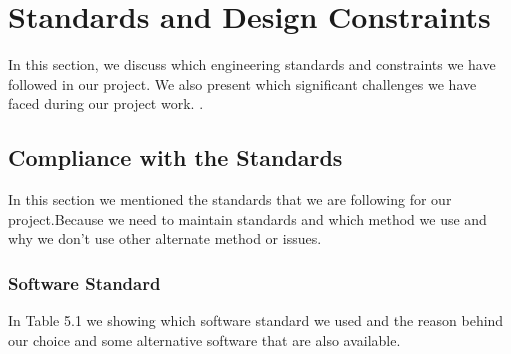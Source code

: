 \chapter{Standards and Design Constraints}
In this section, we discuss which engineering standards and constraints we have followed in our project. We also present which significant challenges we have faced during our project work. . 
\section{Compliance with the Standards}
In this section we mentioned the standards that we are following for our project.Because we need to maintain standards and which method we use and why we don't use other alternate method or issues.

\subsection{Software Standard}
In Table 5.1 we showing which software standard we used and the reason behind our choice and some alternative software that are also available.
